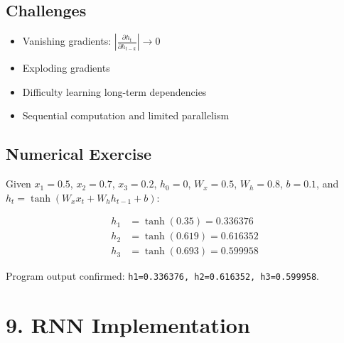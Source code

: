 \documentclass[10pt]{article}
\begin{document}
\subsection*{Challenges}

\begin{itemize}
\item Vanishing gradients: $\left|\frac{\partial h_t}{\partial h_{t-k}}\right|\rightarrow0$
\item Exploding gradients
\item Difficulty learning long-term dependencies
\item Sequential computation and limited parallelism
\end{itemize}

\subsection*{Numerical Exercise}

Given $x_1{=}0.5$, $x_2{=}0.7$, $x_3{=}0.2$, $h_0{=}0$, $W_x{=}0.5$,
$W_h{=}0.8$, $b{=}0.1$, and $h_t{=}\tanh(W_xx_t+W_hh_{t-1}+b)$:

\begin{align*}
h_1 &= \tanh(0.35) = \mathbf{0.336376}\\
h_2 &= \tanh(0.619) = \mathbf{0.616352}\\
h_3 &= \tanh(0.693) = \mathbf{0.599958}
\end{align*}

Program output confirmed: \texttt{h1=0.336376, h2=0.616352, h3=0.599958}.

\section*{9. RNN Implementation}

\begin{center}
\end{center}
\end{document}
